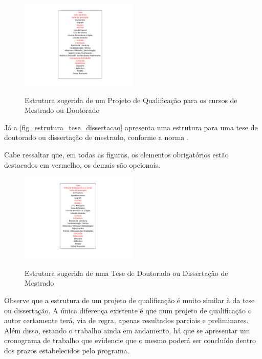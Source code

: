 \begin{apendicesenv}
    \begin{figure}[!htb]
        \centering
        \caption{Estrutura sugerida de um Projeto de Qualificação para os cursos de Mestrado ou Doutorado}
        \includegraphics[width=0.5\textwidth]{figuras/estrutura-projeto-qualificacao}
        \label{fig_estrutura_projeto_qualificacao}
    \end{figure}

    Já a \autoref{fig_estrutura_tese_dissertacao} apresenta uma estrutura para uma tese de doutorado ou dissertação de mestrado, conforme a norma .

    Cabe ressaltar que, em todas as figuras, os elementos obrigatórios estão destacados em vermelho, os demais são opcionais.

    \begin{figure}[!htb]
        \centering
        \caption{Estrutura sugerida de uma Tese de Doutorado ou Dissertação de Mestrado}
        \includegraphics[width=0.5\textwidth]{figuras/estrutura-tese-dissertacao}
        \label{fig_estrutura_tese_dissertacao}
    \end{figure}

    \newpage

    Observe que a estrutura de um projeto de qualificação é muito similar à da tese ou dissertação.
    A única diferença existente é que num projeto de qualificação o autor certamente terá, via de regra, apenas resultados parciais e preliminares.
    Além disso, estando o trabalho ainda em andamento, há que se apresentar um cronograma de trabalho que evidencie que o mesmo poderá ser concluído dentro dos prazos estabelecidos pelo programa.


\end{apendicesenv}
